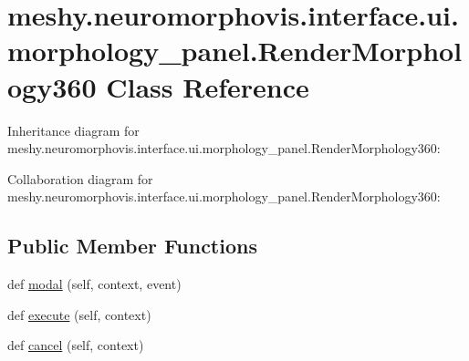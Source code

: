 \hypertarget{classmeshy_1_1neuromorphovis_1_1interface_1_1ui_1_1morphology__panel_1_1RenderMorphology360}{}\section{meshy.\+neuromorphovis.\+interface.\+ui.\+morphology\+\_\+panel.\+Render\+Morphology360 Class Reference}
\label{classmeshy_1_1neuromorphovis_1_1interface_1_1ui_1_1morphology__panel_1_1RenderMorphology360}


Inheritance diagram for meshy.\+neuromorphovis.\+interface.\+ui.\+morphology\+\_\+panel.\+Render\+Morphology360\+:


Collaboration diagram for meshy.\+neuromorphovis.\+interface.\+ui.\+morphology\+\_\+panel.\+Render\+Morphology360\+:
\subsection*{Public Member Functions}
\begin{DoxyCompactItemize}
\item 
def \hyperlink{classmeshy_1_1neuromorphovis_1_1interface_1_1ui_1_1morphology__panel_1_1RenderMorphology360_a90733b91cb5547d5212a57e43e7a3072}{modal} (self, context, event)
\item 
def \hyperlink{classmeshy_1_1neuromorphovis_1_1interface_1_1ui_1_1morphology__panel_1_1RenderMorphology360_ac8bdc4b77e3bdf4b8b2676ec2d407dd0}{execute} (self, context)
\item 
def \hyperlink{classmeshy_1_1neuromorphovis_1_1interface_1_1ui_1_1morphology__panel_1_1RenderMorphology360_a4e2be21d44d9e69733da632ef489457f}{cancel} (self, context)
\end{DoxyCompactItemize}
